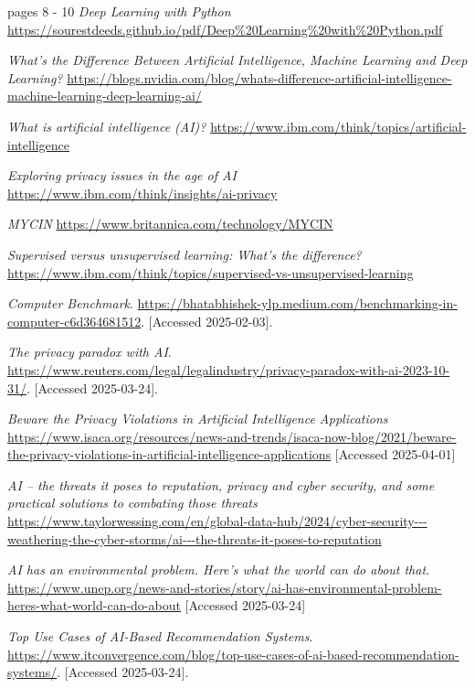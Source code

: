 \documentclass[licencjacka,en]{pracamgr}
\begin{document}
\begin{thebibliography}{99}
pages 8 - 10
\textit{Deep Learning with Python}
\url{https://sourestdeeds.github.io/pdf/Deep%20Learning%20with%20Python.pdf}

\textit{What’s the Difference Between Artificial Intelligence, Machine Learning and Deep Learning?}
\url{https://blogs.nvidia.com/blog/whats-difference-artificial-intelligence-machine-learning-deep-learning-ai/}

\textit{What is artificial intelligence (AI)?}
\url{https://www.ibm.com/think/topics/artificial-intelligence}

\textit{Exploring privacy issues in the age of AI}
\url{https://www.ibm.com/think/insights/ai-privacy}

\textit{MYCIN}
\url{https://www.britannica.com/technology/MYCIN}

\textit{Supervised versus unsupervised learning: What's the difference?}
\url{https://www.ibm.com/think/topics/supervised-vs-unsupervised-learning}

\textit{Computer Benchmark}.
\url{https://bhatabhishek-ylp.medium.com/benchmarking-in-computer-c6d364681512}.
[Accessed 2025-02-03].

\textit{The privacy paradox with AI}.
\url{https://www.reuters.com/legal/legalindustry/privacy-paradox-with-ai-2023-10-31/}.
[Accessed 2025-03-24].

\textit{Beware the Privacy Violations in Artificial Intelligence Applications}
\url{https://www.isaca.org/resources/news-and-trends/isaca-now-blog/2021/beware-the-privacy-violations-in-artificial-intelligence-applications}
[Accessed 2025-04-01]

\textit{AI – the threats it poses to reputation, privacy and cyber security, and some practical solutions to combating those threats}
\url{https://www.taylorwessing.com/en/global-data-hub/2024/cyber-security---weathering-the-cyber-storms/ai---the-threats-it-poses-to-reputation}

\textit{AI has an environmental problem. Here’s what the world can do about that.}
\url{https://www.unep.org/news-and-stories/story/ai-has-environmental-problem-heres-what-world-can-do-about}
[Accessed 2025-03-24]

\textit{Top Use Cases of AI-Based Recommendation Systems}.
\url{https://www.itconvergence.com/blog/top-use-cases-of-ai-based-recommendation-systems/}.
[Accessed 2025-03-24].


\end{thebibliography}
\end{document}
